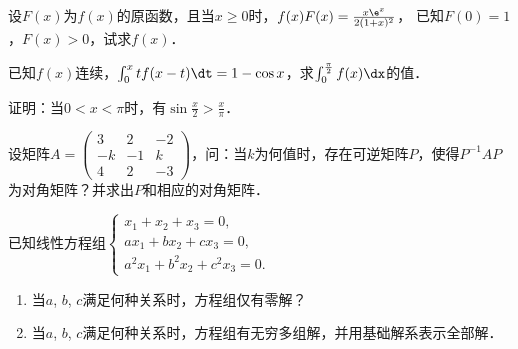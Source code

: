 \documentclass[plain,noanswer,medmath]{../../template/jnuexam}
\begin{document}










\begin{problem}
设$F(x)$为$f(x)$的原函数，且当$x \ge 0$时，$f(x)F(x) = \frac{x\e^x}{2(1 + x)^2}$，
已知$F(0) = 1$，$F(x) > 0$，试求$f(x)$．
\end{problem}



\begin{problem}
已知$f(x)$连续，$\int_0^x t f(x - t)\dt = 1 - \cos x$，求$\int_0^{\frac{\pi}{2}} f (x)\dx$的值．
\end{problem}



\begin{problem}
证明：当$0 < x < \pi$时，有$\sin \frac{x}{2} > \frac{x}{\pi}$．
\end{problem}



\begin{problem}
设矩阵$A = \begin{pmatrix}
   3 &  2 & -2 \\
  -k & -1 & k \\
   4 &  2 & -3
\end{pmatrix}$，问：当$k$为何值时，存在可逆矩阵$P$，使得$P^{-1} AP$为对角矩阵？并求出$P$和相应的对角矩阵．
\end{problem}



\begin{problem}
已知线性方程组$\begin{cases}
  x_1 + x_2 + x_3 = 0, \\
  ax_1 + bx_2 + cx_3 = 0, \\
  a^2x_1 + b^2x_2 + c^2x_3 = 0.
\end{cases}$
\begin{enumerate}
\item 当$a$, $b$, $c$满足何种关系时，方程组仅有零解？
\item 当$a$, $b$, $c$满足何种关系时，方程组有无穷多组解，并用基础解系表示全部解．
\end{enumerate}
\end{problem}
\end{document}
